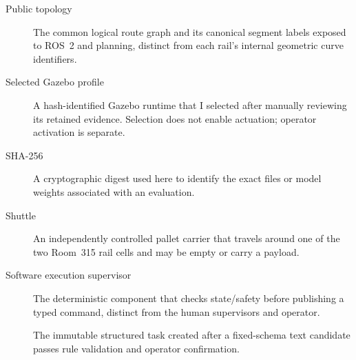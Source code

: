 \begin{description}
  \item[Public topology] The common logical route graph and its canonical
  segment labels exposed to ROS~2 and planning, distinct from each rail's
  internal geometric curve identifiers.
  \item[Selected Gazebo profile] A hash-identified Gazebo runtime that I selected
  after manually reviewing its retained evidence. Selection does not enable
  actuation; operator activation is separate.
  \item[SHA-256] A cryptographic digest used here to identify the exact files or
  model weights associated with an evaluation.
  \item[Shuttle] An independently controlled pallet carrier that travels around
  one of the two Room~315 rail cells and may be empty or carry a payload.
  \item[Software execution supervisor] The deterministic component that checks
  state/safety before publishing a typed command, distinct from the human
  supervisors and operator.
  \item[] The immutable structured task created after a
  fixed-schema text candidate passes rule validation and operator confirmation.
\end{description}

\cleardoublepage
\tableofcontents
\cleardoublepage
\listoffigures
\cleardoublepage
\listoftables
\cleardoublepage
